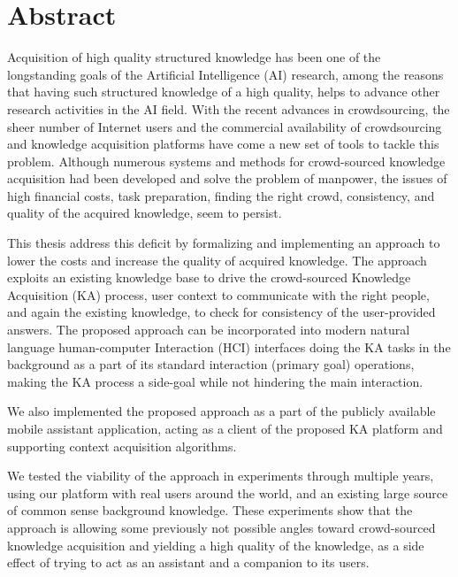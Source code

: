 % 
\chapter*{Abstract}
Acquisition of high quality structured knowledge has been one of the 
longstanding goals of the Artificial Intelligence (AI) research, among the reasons
that having such structured knowledge of a high quality, helps to 
advance other research activities in the AI field. With the recent advances 
in crowdsourcing, the sheer number of Internet users and the commercial 
availability of crowdsourcing and knowledge acquisition platforms have come a 
new set of tools to tackle this problem. Although numerous systems and methods 
for crowd-sourced knowledge acquisition had been developed and solve the problem
of manpower, the issues of high financial costs, task preparation, finding 
the right crowd, consistency, and quality of the acquired knowledge, seem to 
persist. 

This thesis address this deficit by formalizing and implementing an approach
to lower the costs and increase the quality of acquired knowledge. The approach
exploits an existing knowledge base to drive the crowd-sourced Knowledge
Acquisition (KA) process, 
user context to communicate with the right people, and again the existing
knowledge, to check for consistency of the user-provided answers. 
The proposed approach can be incorporated into modern natural language
human-computer Interaction (HCI) interfaces doing the KA tasks in the background
as a part of its standard interaction (primary goal) operations, making the KA
process a side-goal while not hindering the main interaction. 

We also implemented the proposed approach as a part of the publicly available 
mobile assistant application, acting as a client of the proposed KA platform and 
supporting context acquisition algorithms.

We tested the viability of the approach in experiments through multiple years,
using our platform with real users around the world, and an existing large 
source of common sense background knowledge. These experiments show that the 
approach is allowing some previously not possible angles 
toward crowd-sourced knowledge acquisition and yielding a high quality of the 
knowledge, as a side effect of trying to act as an assistant and a companion 
to its users.
